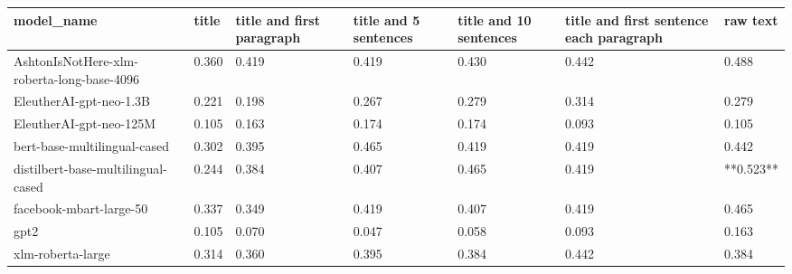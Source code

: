 \begin{tabular}{lllllll}
\toprule
                                model\_name & title & title and first paragraph & title and 5 sentences & title and 10 sentences & title and first sentence each paragraph &  raw text \\
\midrule
AshtonIsNotHere-xlm-roberta-long-base-4096 & 0.360 &                     0.419 &                 0.419 &                  0.430 &                                   0.442 &     0.488 \\
                   EleutherAI-gpt-neo-1.3B & 0.221 &                     0.198 &                 0.267 &                  0.279 &                                   0.314 &     0.279 \\
                   EleutherAI-gpt-neo-125M & 0.105 &                     0.163 &                 0.174 &                  0.174 &                                   0.093 &     0.105 \\
              bert-base-multilingual-cased & 0.302 &                     0.395 &                 0.465 &                  0.419 &                                   0.419 &     0.442 \\
        distilbert-base-multilingual-cased & 0.244 &                     0.384 &                 0.407 &                  0.465 &                                   0.419 & **0.523** \\
                   facebook-mbart-large-50 & 0.337 &                     0.349 &                 0.419 &                  0.407 &                                   0.419 &     0.465 \\
                                      gpt2 & 0.105 &                     0.070 &                 0.047 &                  0.058 &                                   0.093 &     0.163 \\
                         xlm-roberta-large & 0.314 &                     0.360 &                 0.395 &                  0.384 &                                   0.442 &     0.384 \\
\bottomrule
\end{tabular}
